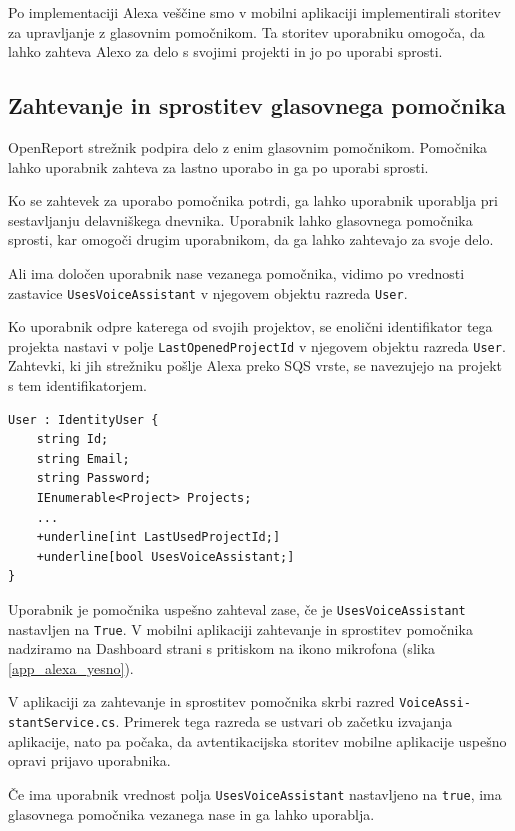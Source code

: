 \documentclass[a4paper, 12pt]{book}
\begin{document}
Po implementaciji Alexa veščine smo v mobilni aplikaciji implementirali storitev za upravljanje z glasovnim pomočnikom.
Ta storitev uporabniku omogoča, da lahko zahteva Alexo za delo s svojimi projekti in jo po uporabi sprosti.


\subsection{Zahtevanje in sprostitev glasovnega pomočnika}

OpenReport strežnik podpira delo z enim glasovnim pomočnikom.
Pomočnika lahko uporabnik {zahteva} za lastno uporabo in ga po uporabi {sprosti}.

Ko se zahtevek za uporabo pomočnika potrdi, ga lahko uporabnik uporablja pri sestavljanju delavniškega dnevnika.
Uporabnik lahko glasovnega pomočnika sprosti, kar omogoči drugim uporabnikom, da ga lahko zahtevajo za svoje delo.

Ali ima določen uporabnik nase vezanega pomočnika, vidimo po vrednosti zastavice \texttt{UsesVoiceAssistant} v njegovem objektu razreda \texttt{User}.

Ko uporabnik odpre katerega od svojih projektov, se enolični identifikator tega projekta nastavi v polje \texttt{LastOpenedProjectId} v njegovem objektu razreda \texttt{User}.
Zahtevki, ki jih strežniku pošlje Alexa preko SQS vrste, se navezujejo na projekt s tem identifikatorjem.

\begin{Verbatim}[commandchars=+\[\]]
User : IdentityUser {
    string Id; 
    string Email;
    string Password; 
    IEnumerable<Project> Projects;
    ... 
    +underline[int LastUsedProjectId;]
    +underline[bool UsesVoiceAssistant;]
}
\end{Verbatim}

Uporabnik je pomočnika uspešno zahteval zase, če je \texttt{UsesVoiceAssistant} nastavljen na \texttt{True}.
V mobilni aplikaciji zahtevanje in sprostitev pomočnika nadziramo na {Dashboard} strani s pritiskom na ikono mikrofona (slika \ref{app_alexa_yesno}).

V aplikaciji za zahtevanje in sprostitev pomočnika skrbi razred \texttt{VoiceAssi-\\stantService.cs}.
Primerek tega razreda se ustvari ob začetku izvajanja aplikacije, nato pa počaka, da avtentikacijska storitev mobilne aplikacije uspešno opravi prijavo uporabnika.

Če ima uporabnik vrednost polja \texttt{UsesVoiceAssistant} nastavljeno na \texttt{true}, ima glasovnega pomočnika vezanega nase in ga lahko uporablja.
\end{document}
